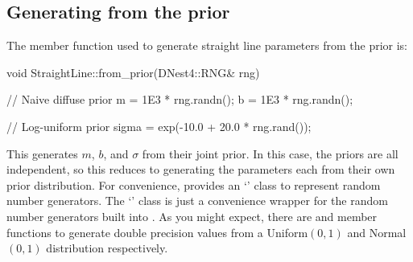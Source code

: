 \documentclass[article]{jss}
\begin{document}




\subsection{Generating from the prior}
The member function used to generate straight line parameters from the
prior is:
%
\begin{CodeChunk}
\begin{CodeInput}
void StraightLine::from_prior(DNest4::RNG& rng)
{
   // Naive diffuse prior
   m = 1E3 * rng.randn();
   b = 1E3 * rng.randn();

   // Log-uniform prior
   sigma = exp(-10.0 + 20.0 * rng.rand());
}
\end{CodeInput}
\end{CodeChunk}
%
This generates $m$, $b$, and $\sigma$ from their joint prior. In this case,
the priors are all independent, so this reduces to generating the parameters
each from their own prior distribution. For convenience,
 provides an `' class to represent random number
generators. The `' class is just a convenience wrapper for the
random number generators built into .
As you might expect, there are
 and  member functions to generate
double precision values
from a Uniform$(0,1)$ and Normal$(0,1)$ distribution respectively.
\end{document}
